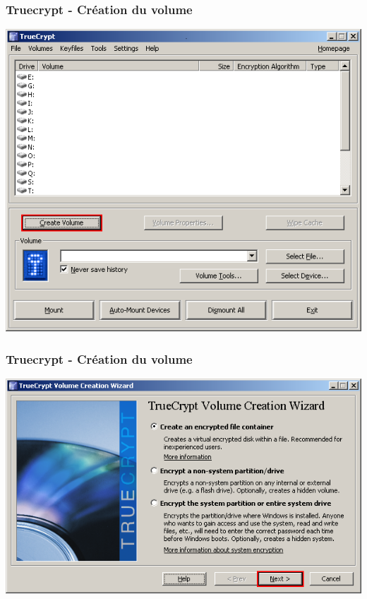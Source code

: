 \documentclass{beamer}
\begin{document}
\begin{frame}
\frametitle{Truecrypt - Création du volume}
\begin{center}
\includegraphics[scale=0.5] {./images/Truecrypt01.png} 
\end{center}
\end{frame}
\begin{frame}
\frametitle{Truecrypt - Création du volume}
\begin{center}
\includegraphics[scale=0.5] {./images/Truecrypt02.png} 
\end{center}
\end{frame}
\end{document}

